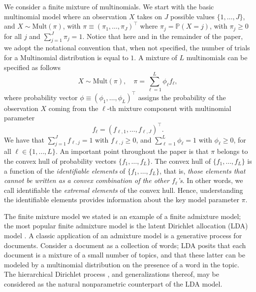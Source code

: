 \documentclass[12pt, reqno]{amsart}
\theoremstyle{definition}
\begin{document}
We consider a finite mixture of multinomials. We start with the basic multinomial model where an observation $X$ takes on $J$ possible values $\{1,\ldots,J\}$, and
$X \sim \mbox{Mult}(\pi)$, with $\pi \equiv (\pi_1,\ldots,\pi_J)^\top$ where $\pi_j=\mathbb{P}(X= j)$, with $\pi_j \geq 0$ for all $j$ and $\sum_{j=1}^J \pi_j=1$. Notice that here and in the remainder of the paper, we adopt the notational convention that, when not specified, the number of trials for a Multinomial distribution is equal to $1$. A mixture of $L$ multinomials can be specified as follows
\begin{equation}\label{fam_first}
    X \sim \mbox{Mult}(\pi), \quad \pi = \sum_{\ell=1}^L \phi_{\ell} f_\ell,
\end{equation}
where probability vector $\phi \equiv (\phi_{1},\ldots,\phi_{L})^\top$ assigns the probability of the  observation $X$ coming from the $\ell$-th mixture component with multinomial parameter 
$$f_\ell=(f_{\ell,1},\ldots,f_{\ell,J})^\top.$$
We have that $\sum_{j=1}^J f_{\ell,j} =1$ with $f_{\ell,j} \geq 0$, and $\sum_{\ell=1}^L \phi_{\ell} =1$ with $\phi_{\ell} \geq 0$, for all $\ell \in \{1,\ldots,L\}$. An important point throughout the paper is that $\pi$ belongs to the convex hull of probability vectors  $\{f_1,\ldots,f_L\}$. The convex hull of $\{f_1,\ldots,f_L\}$ is a function of the {\em identifiable elements} of $\{f_1,\ldots,f_L\}$, that is, {\em those elements that cannot be written as a convex combination of the other $f_\ell$'s}. In other words, we call identifiable the {\em extremal elements} of the convex hull. Hence, understanding the identifiable elements provides information about the  key model parameter $\pi$.
 

The finite mixture model we stated is an example of a finite admixture model; the most popular finite admixture model is the latent Dirichlet allocation (LDA) model \cite{blei, Pritchard945}. A classic application of an admixture model is a generative process for documents. Consider a document as a collection of words; LDA posits  that each document is a mixture of a small number of topics, and that these latter can be modeled by a multinomial distribution on the presence of a word in the topic. The hierarchical Dirichlet process \cite{teh}, and generalizations thereof, may be considered as the natural nonparametric counterpart of the LDA model.
\end{document}
